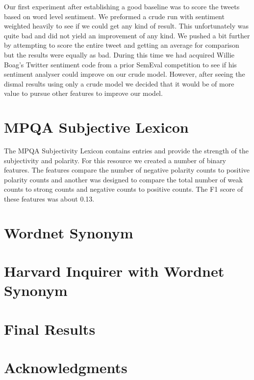 \documentclass[11pt,letterpaper]{article}
\begin{document}

Our first experiment after establishing a good baseline was to score the tweets based on word level sentiment. We preformed a crude run with sentiment weighted heavily to see if we could get any kind of result. This unfortunately was quite bad and did not yield an improvement of any kind. We pushed a bit further by attempting to score the entire tweet and getting an average for comparison but the results were equally as bad. During this time we had acquired Willie Boag's Twitter sentiment code from a prior SemEval competition to see if his sentiment analyser could improve on our crude model. However, after seeing the dismal results using only a crude model we decided that it would be of more value to pursue other features to improve our model.

\section{MPQA Subjective Lexicon}
The MPQA Subjectivity Lexicon contains entries and provide the strength of the subjectivity and polarity. For this resource we created a number of binary features. The features compare the number of negative polarity counts to positive polarity counts and another was designed to compare the total number of weak counts to strong counts and negative counts to positive counts. The F1 score of these features was about 0.13.


\section{Wordnet Synonym}


\section{Harvard Inquirer with Wordnet Synonym}

\section{Final Results}


\section*{Acknowledgments}
\end{document}
